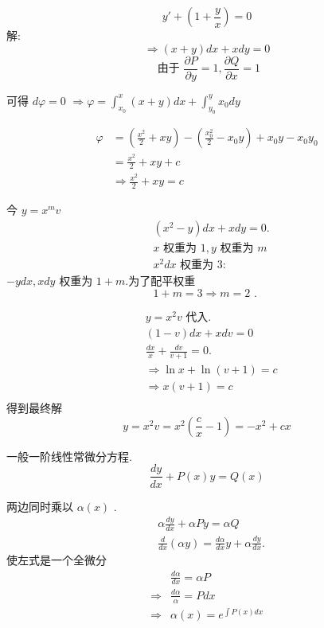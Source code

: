 \begin{examplebox}{
$$
y'+\left(1+\frac{y}{x}\right)=0
$$
}
解:
$$
\Rightarrow(x+y) d x+x d y=0
$$
$$
\text { 由于 } \frac{\partial P}{\partial y}=1, \frac{\partial Q}{\partial x}=1
$$

可得 $d \varphi=0$
$\Rightarrow \varphi=\int_{x_0}^x(x+y) d x+\int_{y_0}^y x_0 d y$

\begin{equation}
    \begin{aligned}
    \varphi & =\left(\frac{x^2}{2}+x y\right)-\left(\frac{x_0^2}{2}-x_0 y\right)+x_0 y-x_0 y_0 \\
    & =\frac{x^2}{2}+x y+c \\
    & \Rightarrow \frac{x^2}{2}+x y=c
    \end{aligned}
    \end{equation}
\end{examplebox}


今 $y=x^{m}v$
$$
\begin{aligned}
& \left(x^2-y\right) d x+x d y=0 . \\
& x \text { 权重为 } 1, y\text { 权重为 }m \\
& x^2 d x \text { 权重为 } 3:
\end{aligned}
$$
$-ydx,  x d y$ 权重为 $1+m$.为了配平权重
$$
1+m=3 \Rightarrow m=2 \text { . }
$$


$$
\begin{aligned}
& y=x^2 v \text { 代入. } \\
& (1-v) d x+x d v=0 \\
& \frac{d x}{x}+\frac{d v}{v+1}=0 . \\
& \Rightarrow \ln x+\ln (v+1)=c \\
& \Rightarrow x(v+1)=c \\
\end{aligned}
$$
得到最终解
\begin{equation*}
    y=x^2 v=x^2\left(\frac{c}{x}-1\right) = -x^2+c x 
\end{equation*}


一般一阶线性常微分方程.
$$
\frac{d y}{d x}+P(x) y=Q(x)
$$

两边同时乘以 $\alpha(x)$ .
$$
\begin{aligned}
& \alpha \frac{d y}{d x}+\alpha Py=\alpha Q \\
& \frac{d}{d x}(\alpha y)=\frac{d \alpha}{d x} y+\alpha \frac{d y}{d x} .
\end{aligned}
$$
使左式是一个全微分
$$
\begin{aligned}
& \frac{d \alpha}{d x}=\alpha P \\
\Rightarrow & \frac{d \alpha}{\alpha}=P d x \\
\Rightarrow  &  \alpha(x)=e^{\int P(x) d x}
\end{aligned}
$$


